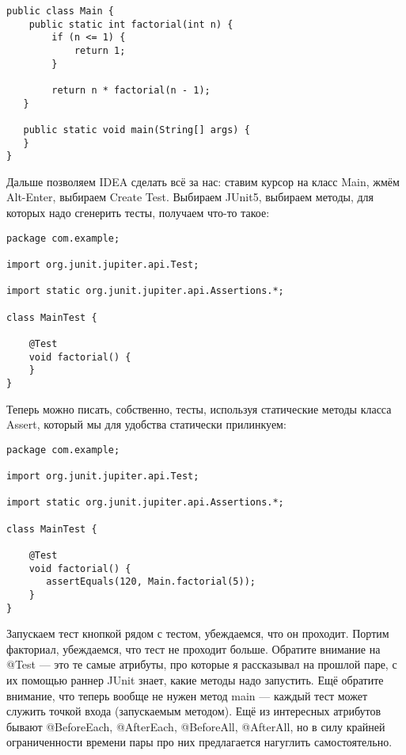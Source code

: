 \documentclass[a5paper]{article}
\begin{document}
\begin{verbatim}
public class Main {
    public static int factorial(int n) {
        if (n <= 1) {
            return 1;
        }

        return n * factorial(n - 1);
   }

   public static void main(String[] args) {
   }
}
\end{verbatim}

Дальше позволяем IDEA сделать всё за нас: ставим курсор на класс Main, жмём Alt-Enter, выбираем Create Test. Выбираем JUnit5,  выбираем методы, для которых надо сгенерить тесты, получаем что-то такое:

\begin{verbatim}
package com.example;

import org.junit.jupiter.api.Test;

import static org.junit.jupiter.api.Assertions.*;

class MainTest {

    @Test
    void factorial() {
    }
}
\end{verbatim}

Теперь можно писать, собственно, тесты, используя статические методы класса Assert, который мы для удобства статически прилинкуем:
\begin{verbatim}
package com.example;

import org.junit.jupiter.api.Test;

import static org.junit.jupiter.api.Assertions.*;

class MainTest {

    @Test
    void factorial() {
       assertEquals(120, Main.factorial(5));
    }
}
\end{verbatim}

Запускаем тест кнопкой рядом с тестом, убеждаемся, что он проходит. Портим факториал, убеждаемся, что тест не проходит больше. Обратите внимание на @Test --- это те самые атрибуты, про которые я рассказывал на прошлой паре, с их помощью раннер JUnit знает, какие методы надо запустить. Ещё обратите внимание, что теперь вообще не нужен метод main --- каждый тест может служить точкой входа (запускаемым методом). Ещё из интересных атрибутов бывают @BeforeEach, @AfterEach, @BeforeAll, @AfterAll, но в силу крайней ограниченности времени пары про них предлагается нагуглить самостоятельно.
\end{document}
